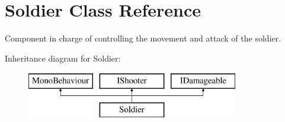 \hypertarget{class_soldier}{}\section{Soldier Class Reference}
\label{class_soldier}


Component in charge of controlling the movement and attack of the soldier.  


Inheritance diagram for Soldier\+:\begin{figure}[H]
\begin{center}
\leavevmode
\includegraphics[height=2.000000cm]{class_soldier}
\end{center}
\end{figure}
